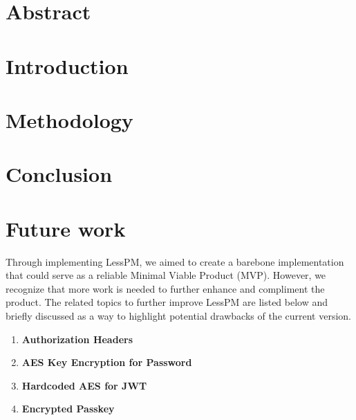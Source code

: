 \documentclass{article}
\begin{document}
    \fi

    \section*{Abstract}

    \section*{Introduction}
    

    \section*{Methodology}
    

    \section*{Conclusion}

    \section*{Future work}\label{sec:futurework}
    Through implementing LessPM, we aimed to create a barebone implementation that could serve as a reliable Minimal
    Viable Product (MVP). However, we recognize that more work is needed to further enhance and compliment the product.
    The related topics to further improve LessPM are listed below and briefly discussed as a way to highlight
    potential drawbacks of the current version.

    \begin{enumerate}[label=$\blacktriangleright$]
        \item \textbf{Authorization Headers}
        \item \textbf{AES Key Encryption for Password}
        \item \textbf{Hardcoded AES for JWT}
        \item \textbf{Encrypted Passkey}
    \end{enumerate}
    \newpage
    \printbibliography
\end{document}
